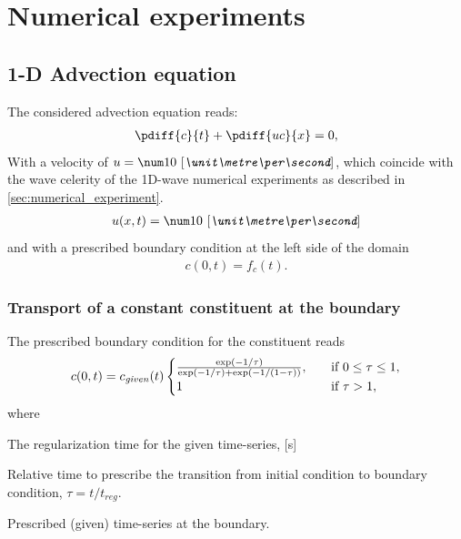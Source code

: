 \chapter{Numerical experiments}\label{sec:1d_numerical_experiments}
\section{1-D Advection equation}
The considered advection equation reads:
\begin{align}
    \pdiff{c}{t} + \pdiff{uc}{x} = 0,
\end{align}
With a velocity of $u = \bqty{10}{\metre\per\second}$, which coincide with the wave celerity of the 1D-wave numerical experiments as described in \autoref{sec:numerical_experiment}.
\begin{align}
    u(x,t) = \bqty{10}{\metre\per\second}
\end{align}
and with a prescribed boundary condition at the left side of the domain
\begin{align}
    c(0,t) = f_c(t).
\end{align}
\subsection{Transport of a constant constituent at the boundary} \label{sec:numerical_experiment_1d_adv_constant_boundary}
The prescribed boundary condition for the constituent reads
\begin{align}
    c(0,t) = c_{\it given}(t)
    \begin{cases}
        \frac{\exp(-1/\tau) }{ \exp(-1/\tau) + \exp(-1 / (1 - \tau))},
        &\quad \text{if\ }0 \leq \tau \leq 1,
        \\
        1 &\quad \text{if\ }\tau > 1,
    \end{cases}
    \label{eq:1d_adv_boundary_condition}
\end{align}
where
\begin{symbollist}
    \item[$t_{reg}$] The regularization time for the given time-series, [\si{\second}]
    \item[$\tau$] Relative time to prescribe the transition from initial condition to boundary condition, $\tau = t/t_{reg}$.
    \item[$c_{\it given}(t)$] Prescribed (given) time-series at the boundary.
\end{symbollist}
